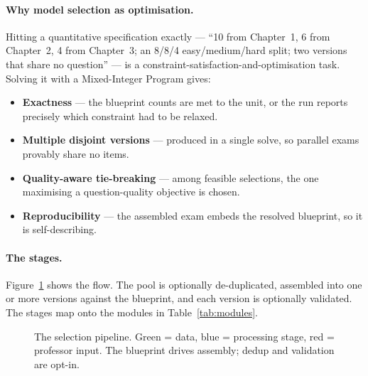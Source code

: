 \documentclass[11pt,a4paper]{article}
\begin{document}
\paragraph{Why model selection as optimisation.}
Hitting a quantitative specification exactly --- ``10 from Chapter~1, 6 from
Chapter~2, 4 from Chapter~3; an 8/8/4 easy/medium/hard split; two versions that
share no question'' --- is a constraint-satisfaction-and-optimisation task.
Solving it with a Mixed-Integer Program gives:
\begin{itemize}[nosep,leftmargin=1.4em]
  \item \textbf{Exactness} --- the blueprint counts are met to the unit, or the
        run reports precisely which constraint had to be relaxed.
  \item \textbf{Multiple disjoint versions} --- produced in a single solve, so
        parallel exams provably share no items.
  \item \textbf{Quality-aware tie-breaking} --- among feasible selections, the
        one maximising a question-quality objective is chosen.
  \item \textbf{Reproducibility} --- the assembled exam embeds the resolved
        blueprint, so it is self-describing.
\end{itemize}

\paragraph{The stages.}
Figure~\ref{fig:pipeline} shows the flow. The pool is optionally
de-duplicated, assembled into one or more versions against the blueprint, and
each version is optionally validated. The stages map onto the modules in
Table~\ref{tab:modules}.

\begin{figure}[h]
\centering
{}
\caption{The selection pipeline. Green = data, blue = processing stage, red =
professor input. The blueprint drives assembly; dedup and validation are
opt-in.}
\label{fig:pipeline}
\end{figure}
\end{document}
